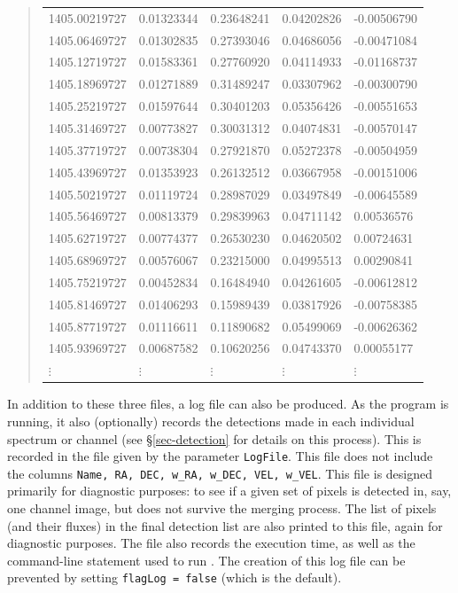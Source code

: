 \begin{quote}
  {\footnotesize
    \begin{tabular}{lllll}
      1405.00219727  &0.01323344  &0.23648241  &0.04202826  &-0.00506790  \\
      1405.06469727  &0.01302835  &0.27393046  &0.04686056  &-0.00471084  \\
      1405.12719727  &0.01583361  &0.27760920  &0.04114933  &-0.01168737  \\
      1405.18969727  &0.01271889  &0.31489247  &0.03307962  &-0.00300790  \\
      1405.25219727  &0.01597644  &0.30401203  &0.05356426  &-0.00551653  \\
      1405.31469727  &0.00773827  &0.30031312  &0.04074831  &-0.00570147  \\
      1405.37719727  &0.00738304  &0.27921870  &0.05272378  &-0.00504959  \\
      1405.43969727  &0.01353923  &0.26132512  &0.03667958  &-0.00151006  \\  
      1405.50219727  &0.01119724  &0.28987029  &0.03497849  &-0.00645589  \\  
      1405.56469727  &0.00813379  &0.29839963  &0.04711142  &0.00536576   \\  
      1405.62719727  &0.00774377  &0.26530230  &0.04620502  &0.00724631   \\  
      1405.68969727  &0.00576067  &0.23215000  &0.04995513  &0.00290841   \\ 
      1405.75219727  &0.00452834  &0.16484940  &0.04261605  &-0.00612812  \\  
      1405.81469727  &0.01406293  &0.15989439  &0.03817926  &-0.00758385  \\ 
      1405.87719727  &0.01116611  &0.11890682  &0.05499069  &-0.00626362  \\  
      1405.93969727  &0.00687582  &0.10620256  &0.04743370  &0.00055177   \\
      $\vdots$       &$\vdots$    &$\vdots$    &$\vdots$    &$\vdots$     \\
    \end{tabular}
  }
\end{quote}

\label{sec-logfile}

In addition to these three files, a log file can also be produced. As
the program is running, it also (optionally) records the detections
made in each individual spectrum or channel (see \S\ref{sec-detection}
for details on this process). This is recorded in the file given by
the parameter \texttt{LogFile}. This file does not include the columns
\texttt{Name, RA, DEC, w\_RA, w\_DEC, VEL, w\_VEL}. This file is
designed primarily for diagnostic purposes: \eg to see if a given set
of pixels is detected in, say, one channel image, but does not survive
the merging process. The list of pixels (and their fluxes) in the
final detection list are also printed to this file, again for
diagnostic purposes. The file also records the execution time, as well
as the command-line statement used to run \duchamp. The creation of
this log file can be prevented by setting \texttt{flagLog = false}
(which is the default).

